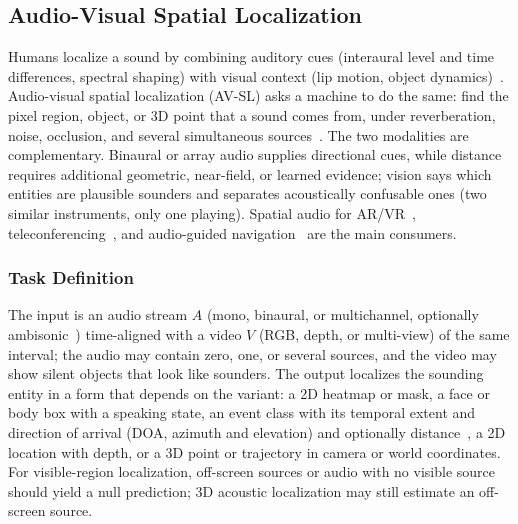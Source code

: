 
\subsection{Audio-Visual Spatial Localization}
\label{sec:av_localization}

Humans localize a sound by combining auditory cues (interaural level and time differences, spectral shaping) with visual context (lip motion, object dynamics)~\cite{blauert1997spatial}. Audio-visual spatial localization (AV-SL) asks a machine to do the same: find the pixel region, object, or 3D point that a sound comes from, under reverberation, noise, occlusion, and several simultaneous sources~\cite{arandjelovic2017look,owens2018audio}. The two modalities are complementary. Binaural or array audio supplies directional cues, while distance requires additional geometric, near-field, or learned evidence; vision says which entities are plausible sounders and separates acoustically confusable ones (two similar instruments, only one playing). Spatial audio for AR/VR~\cite{morgado2018self}, teleconferencing~\cite{tao2021talknet}, and audio-guided navigation~\cite{chen2020soundspaces} are the main consumers.

\subsubsection{Task Definition}
The input is an audio stream $A$ (mono, binaural, or multichannel, optionally ambisonic~\cite{zotter2019ambisonics}) time-aligned with a video $V$ (RGB, depth, or multi-view) of the same interval; the audio may contain zero, one, or several sources, and the video may show silent objects that look like sounders. The output localizes the sounding entity in a form that depends on the variant: a 2D heatmap or mask, a face or body box with a speaking state, an event class with its temporal extent and direction of arrival (DOA, azimuth and elevation) and optionally distance~\cite{politis2023dataset}, a 2D location with depth, or a 3D point or trajectory in camera or world coordinates. For visible-region localization, off-screen sources or audio with no visible source should yield a null prediction; 3D acoustic localization may still estimate an off-screen source.

